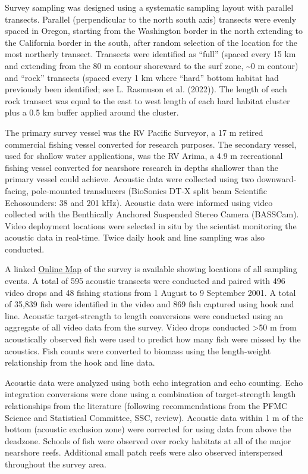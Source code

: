 \documentclass[11pt,
  english,
  letterpaper,
]{article}
\begin{document}
Survey sampling was designed using a systematic sampling layout with parallel transects. Parallel (perpendicular to the north south axis) transects were evenly spaced in Oregon, starting from the Washington border in the north extending to the California border in the south, after random selection of the location for the most northerly transect. Transects were identified as ``full'' (spaced every 15 km and extending from the 80 m contour shoreward to the surf zone, \textasciitilde0 m contour) and ``rock'' transects (spaced every 1 km where ``hard'' bottom habitat had previously been identified; see L. Rasmuson et al. (2022)). The length of each rock transect was equal to the east to west length of each hard habitat cluster plus a 0.5 km buffer applied around the cluster.

The primary survey vessel was the RV Pacific Surveyor, a 17 m retired commercial fishing vessel converted for research purposes. The secondary vessel, used for shallow water applications, was the RV Arima, a 4.9 m recreational fishing vessel converted for nearshore research in depths shallower than the primary vessel could achieve. Acoustic data were collected using two downward-facing, pole-mounted transducers (BioSonics DT-X split beam Scientific Echosounders: 38 and 201 kHz). Acoustic data were informed using video collected with the Benthically Anchored Suspended Stereo Camera (BASSCam). Video deployment locations were selected in situ by the scientist monitoring the acoustic data in real-time. Twice daily hook and line sampling was also conducted.

A linked \href{https://www.arcgis.com/apps/mapviewer/index.html?webmap=49e8f3a8079448c29a21d4384d2b50dd}{Online Map} of the survey is available showing locations of all sampling events. A total of 595 acoustic transects were conducted and paired with 496 video drops and 48 fishing stations from 1 August to 9 September 2001. A total of 35,839 fish were identified in the video and 869 fish captured using hook and line. Acoustic target-strength to length conversions were conducted using an aggregate of all video data from the survey. Video drops conducted \textgreater50 m from acoustically observed fish were used to predict how many fish were missed by the acoustics. Fish counts were converted to biomass using the length-weight relationship from the hook and line data.

Acoustic data were analyzed using both echo integration and echo counting. Echo integration conversions were done using a combination of target-strength length relationships from the literature (following recommendations from the PFMC Science and Statistical Committee, SSC, review). Acoustic data within 1 m of the bottom (acoustic exclusion zone) were corrected for using data from above the deadzone. Schools of fish were observed over rocky habitats at all of the major nearshore reefs. Additional small patch reefs were also observed interspersed throughout the survey area.
\end{document}

